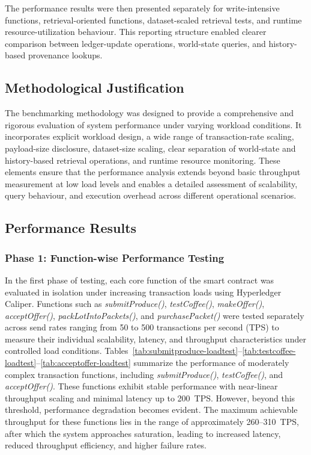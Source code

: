 \documentclass[12pt]{article}
\begin{document}
	The performance results were then presented separately for write-intensive functions, retrieval-oriented functions, dataset-scaled retrieval tests, and runtime resource-utilization behaviour. This reporting structure enabled clearer comparison between ledger-update operations, world-state queries, and history-based provenance lookups.
	
	\subsection{Methodological Justification}
	
	The benchmarking methodology was designed to provide a comprehensive and rigorous evaluation of system performance under varying workload conditions. It incorporates explicit workload design, a wide range of transaction-rate scaling, payload-size disclosure, dataset-size scaling, clear separation of world-state and history-based retrieval operations, and runtime resource monitoring. These elements ensure that the performance analysis extends beyond basic throughput measurement at low load levels and enables a detailed assessment of scalability, query behaviour, and execution overhead across different operational scenarios.
	
	
	
	\subsection{Performance Results}
	
	\subsubsection{Phase 1: Function-wise Performance Testing}
	
	In the first phase of testing, each core function of the smart contract was evaluated in isolation under increasing transaction loads using Hyperledger Caliper. Functions such as \textit{submitProduce()}, \textit{testCoffee()}, \textit{makeOffer()}, \textit{acceptOffer()}, \textit{packLotIntoPackets()}, and \textit{purchasePacket()} were tested separately across send rates ranging from 50 to 500 transactions per second (TPS) to measure their individual scalability, latency, and throughput characteristics under controlled load conditions.
	Tables~\ref{tab:submitproduce-loadtest}--\ref{tab:testcoffee-loadtest}--\ref{tab:acceptoffer-loadtest} summarize the performance of moderately complex transaction functions, including \textit{submitProduce()}, \textit{testCoffee()}, and \textit{acceptOffer()}. These functions exhibit stable performance with near-linear throughput scaling and minimal latency up to 200~TPS. However, beyond this threshold, performance degradation becomes evident. The maximum achievable throughput for these functions lies in the range of approximately 260--310~TPS, after which the system approaches saturation, leading to increased latency, reduced throughput efficiency, and higher failure rates.
	
\end{document}
